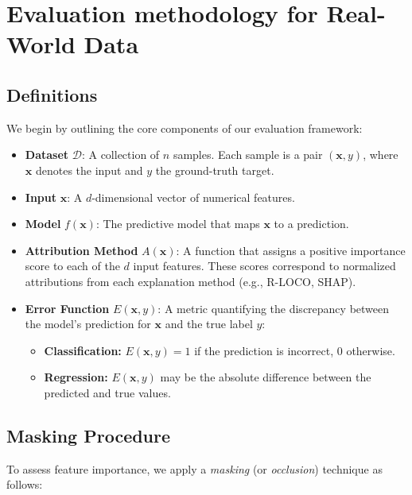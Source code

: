 \documentclass{article}
\theoremstyle{plain}
\theoremstyle{definition}
\theoremstyle{remark}
\begin{document}
\section{Evaluation methodology for Real-World Data} \label{exp:real_details}

\label{sec:evaluation-methodology}

\subsection{Definitions}
We begin by outlining the core components of our evaluation framework:

\begin{itemize}
    \item \textbf{Dataset} $\mathcal{D}$: A collection of $n$ samples. Each sample is a pair $(\mathbf{x}, y)$, where $\mathbf{x}$ denotes the input and $y$ the ground-truth target.
    \item \textbf{Input} $\mathbf{x}$: A $d$-dimensional vector of numerical features.
    \item \textbf{Model} $f(\mathbf{x})$: The predictive model that maps $\mathbf{x}$ to a prediction.
    \item \textbf{Attribution Method} $A(\mathbf{x})$: A function that assigns a positive importance score to each of the $d$ input features. These scores correspond to normalized attributions from each explanation method (e.g., R-LOCO, SHAP).
    \item \textbf{Error Function} $E(\mathbf{x}, y)$: A metric quantifying the discrepancy between the model’s prediction for $\mathbf{x}$ and the true label $y$:
    \begin{itemize}
        \item \textbf{Classification:} $E(\mathbf{x}, y) = 1$ if the prediction is incorrect, $0$ otherwise.
        \item \textbf{Regression:} $E(\mathbf{x}, y)$ may be the absolute difference between the predicted and true values.
    \end{itemize}
\end{itemize}

\subsection{Masking Procedure}
To assess feature importance, we apply a \emph{masking} (or \emph{occlusion}) technique as follows:
\end{document}
